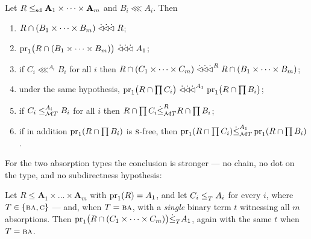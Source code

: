 \begin{longcorollary}\label{cor:prop-relations}
Let $R\sdle\mathbf A_{1}\times\dots\times\mathbf A_{m}$ and $B_{i}\lll A_{i}$.
Then
\begin{enumerate}\tightlist
\item[\textup{(r)}] $R\cap(B_{1}\times\dots\times B_{m})\dlll R$;
\item[\textup{(r1)}] $\proj_{1}\bigl(R\cap(B_{1}\times\dots\times B_{m})\bigr)
  \dlll A_{1}$;
\item[\textup{(b)}] if $C_{i}\lll^{A_{i}}B_{i}$ for all $i$ then
  $R\cap(C_{1}\times\dots\times C_{m})\dlll^{R}R\cap(B_{1}\times\dots\times B_{m})$;
\item[\textup{(b1)}] under the same hypothesis,
  $\proj_{1}\bigl(R\cap\prod C_{i}\bigr)\dlll^{A_{1}}
   \proj_{1}\bigl(R\cap\prod B_{i}\bigr)$;
\item[\textup{(m)}] if $C_{i}\subte[A_{i}]{\MT T}B_{i}$ for all $i$ then
  $R\cap\prod C_{i}\dsubte[R]{\MT T}R\cap\prod B_{i}$;
\item[\textup{(m1)}] if in addition $\proj_{1}(R\cap\prod B_{i})$ is
  $\TS$-free, then $\proj_{1}(R\cap\prod C_{i})
   \dsubte[A_{1}]{\MT T}\proj_{1}(R\cap\prod B_{i})$.
\end{enumerate}
\end{longcorollary}

For the two absorption types the conclusion is stronger --- no chain, no dot on
the type, and no subdirectness hypothesis:

\begin{lemma}\label{lem:ba-center-implies}
Let $R\le\mathbf A_{1}\times\dots\times\mathbf A_{m}$ with
$\proj_{1}(R)=A_{1}$, and let $C_{i}\subte{T}A_{i}$ for every $i$, where
$T\in\{\TBA,\TC\}$ --- and, when $T=\TBA$, with a \emph{single} binary term $t$
witnessing all $m$ absorptions. Then
$\proj_{1}\bigl(R\cap(C_{1}\times\dots\times C_{m})\bigr)\dsubte{T}A_{1}$,
again with the same $t$ when $T=\TBA$.
\end{lemma}

